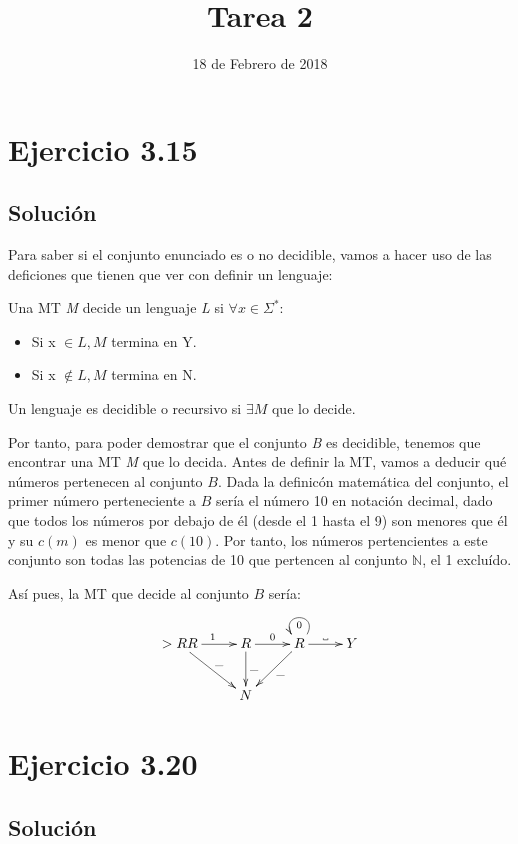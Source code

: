 \documentclass[11pt, a4paper, titlepage]{article}
\newcommand\vartextvisiblespace[1][.5em]{%
  \makebox[#1]{%
    \kern.07em
    \vrule height.3ex
    \hrulefill
    \vrule height.3ex
    \kern.07em
  }%
}
\begin{document}
\title{Tarea 2}
\date{18 de Febrero de 2018}
\maketitle
\newpage



\section*{Ejercicio 3.15}
\subsection*{Solución}


Para saber si el conjunto enunciado es o no decidible, vamos a hacer uso de las
deficiones que tienen que ver con definir un lenguaje:

Una MT \textit{M} decide un lenguaje \textit{L} si $\forall x \in \Sigma^*:$
\begin{itemize}
  \item Si x $\in \textit{L}, \textit{M}$ termina en Y.
  \item Si x $\notin \textit{L}, \textit{M}$ termina en N.
\end{itemize}

Un lenguaje es decidible o recursivo si $\exists \textit{M}$ que lo decide.


Por tanto, para poder demostrar que el conjunto \textit{B} es decidible, tenemos
que encontrar una MT \textit{M} que lo decida. Antes de definir la MT, vamos a deducir
qué números pertenecen al conjunto $B$. Dada la definicón matemática del conjunto, el
primer número perteneciente a $B$ sería el número 10 en notación decimal, dado
que todos los números por debajo de él (desde el 1 hasta el 9) son menores que él y su
$c(m)$ es menor que $c(10)$. Por tanto, los números pertencientes a este conjunto son
todas las potencias de 10 que pertencen al conjunto $\mathbb{N}$, el 1 excluído.

Así pues, la MT que decide al conjunto $B$ sería:


\[
\xymatrix{
  >RR \ar[r]^{1} \ar[dr]^{\_} & R \ar[r]^{0} \ar[d]^{\_} & R \ar[ld]^{\_} \ar@(ur,ul)^{0} \ar[r]^{\vartextvisiblespace} & Y \\
  & N
}
\]

\section*{Ejercicio 3.20}
\subsection*{Solución}
\end{document}
